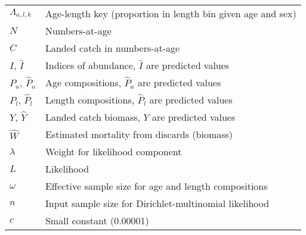 \documentclass[]{article}
\begin{document}
\begin{table}
\begin{tabular}[t]{ll}
\hspace{1em}$\Lambda_{a,l,k}$ & Age-length key (proportion in length bin given age and sex)\\
\hspace{1em}$N$ & Numbers-at-age\\
\hspace{1em}$C$ & Landed catch in numbers-at-age\\
\hspace{1em}$I$, $\hat{I}$ & Indices of abundance, $\hat{I}$ are predicted values\\
\hspace{1em}$P_a$, $\hat{P}_a$ & Age compositions, $\hat{P}_a$ are predicted values\\
\hspace{1em}$P_l$, $\hat{P}_l$ & Length compositions, $\hat{P}_l$ are predicted values\\
\hspace{1em}$Y$, $\hat{Y}$ & Landed catch biomass, $\hat{Y}$ are predicted values\\
\hspace{1em}$\hat{W}$ & Estimated mortality from discards (biomass)\\
\hspace{1em}$\lambda$ & Weight for likelihood component\\
\hspace{1em}$L$ & Likelihood\\
\hspace{1em}$\omega$ & Effective sample size for age and length compositions\\
\hspace{1em}$n$ & Input sample size for Dirichlet-multinomial likelihood\\
\hspace{1em}$c$ & Small constant (0.00001)\\
\bottomrule
\end{tabular}
\end{table}
\end{document}
